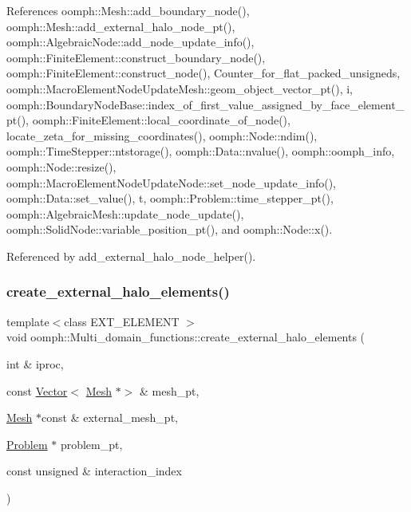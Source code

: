 References oomph\+::\+Mesh\+::add\+\_\+boundary\+\_\+node(), oomph\+::\+Mesh\+::add\+\_\+external\+\_\+halo\+\_\+node\+\_\+pt(), oomph\+::\+Algebraic\+Node\+::add\+\_\+node\+\_\+update\+\_\+info(), oomph\+::\+Finite\+Element\+::construct\+\_\+boundary\+\_\+node(), oomph\+::\+Finite\+Element\+::construct\+\_\+node(), Counter\+\_\+for\+\_\+flat\+\_\+packed\+\_\+unsigneds, oomph\+::\+Macro\+Element\+Node\+Update\+Mesh\+::geom\+\_\+object\+\_\+vector\+\_\+pt(), i, oomph\+::\+Boundary\+Node\+Base\+::index\+\_\+of\+\_\+first\+\_\+value\+\_\+assigned\+\_\+by\+\_\+face\+\_\+element\+\_\+pt(), oomph\+::\+Finite\+Element\+::local\+\_\+coordinate\+\_\+of\+\_\+node(), locate\+\_\+zeta\+\_\+for\+\_\+missing\+\_\+coordinates(), oomph\+::\+Node\+::ndim(), oomph\+::\+Time\+Stepper\+::ntstorage(), oomph\+::\+Data\+::nvalue(), oomph\+::oomph\+\_\+info, oomph\+::\+Node\+::resize(), oomph\+::\+Macro\+Element\+Node\+Update\+Node\+::set\+\_\+node\+\_\+update\+\_\+info(), oomph\+::\+Data\+::set\+\_\+value(), t, oomph\+::\+Problem\+::time\+\_\+stepper\+\_\+pt(), oomph\+::\+Algebraic\+Mesh\+::update\+\_\+node\+\_\+update(), oomph\+::\+Solid\+Node\+::variable\+\_\+position\+\_\+pt(), and oomph\+::\+Node\+::x().



Referenced by add\+\_\+external\+\_\+halo\+\_\+node\+\_\+helper().

\mbox{\label{namespaceoomph_1_1Multi__domain__functions_a7d9b0f9da301d95c3442860f127ab2ae}} 
\subsubsection{\texorpdfstring{create\+\_\+external\+\_\+halo\+\_\+elements()}{create\_external\_halo\_elements()}}
{\footnotesize\ttfamily template$<$class E\+X\+T\+\_\+\+E\+L\+E\+M\+E\+NT $>$ \\
void oomph\+::\+Multi\+\_\+domain\+\_\+functions\+::create\+\_\+external\+\_\+halo\+\_\+elements (\begin{DoxyParamCaption}\item[{int \&}]{iproc,  }\item[{const \hyperlink{classoomph_1_1Vector}{Vector}$<$ \hyperlink{classoomph_1_1Mesh}{Mesh} $\ast$$>$ \&}]{mesh\+\_\+pt,  }\item[{\hyperlink{classoomph_1_1Mesh}{Mesh} $\ast$const \&}]{external\+\_\+mesh\+\_\+pt,  }\item[{\hyperlink{classoomph_1_1Problem}{Problem} $\ast$}]{problem\+\_\+pt,  }\item[{const unsigned \&}]{interaction\+\_\+index }\end{DoxyParamCaption})}



